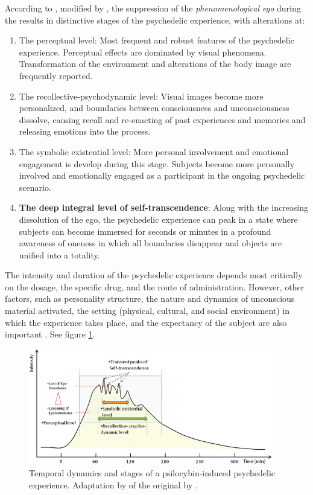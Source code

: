 According to \textcite{masters2000varieties}, modified by \textcite{preller2016phenomenology}, the suppression of the \textit{phenomenological ego} during the results in distinctive stages of the psychedelic experience, with alterations at:

\begin{enumerate}
    \setlength{\itemsep}{0pt}
    \setlength{\parskip}{0pt}
    \item The perceptual level: Most frequent and robust features of the psychedelic experience. Perceptual effects are dominated by visual phenomena. Transformation of the environment and alterations of the body image are frequently reported.
    \item The recollective-psychodynamic level: Visual images become more personalized, and boundaries between consciousness and unconsciousness dissolve, causing recall and re-enacting of past experiences and memories and releasing emotions into the process.
    \item The symbolic existential level: More personal involvement and emotional engagement is develop during this stage. Subjects become more personally involved and emotionally engaged as a participant in the ongoing psychedelic scenario.
    \item \textbf{The deep integral level of self-transcendence}: Along with the increasing dissolution of the ego, the psychedelic experience can peak in a state where subjects can become immersed for seconds or minutes in a profound awareness of oneness in which all boundaries disappear and objects are unified into a totality.
\end{enumerate}

The intensity and duration of the psychedelic experience depends most critically on the dosage, the specific drug, and the route of administration. However, other factors, such as personality structure, the nature and dynamics of unconscious material activated, the setting (physical, cultural, and social environment) in which the experience takes place, and the expectancy of the subject are also important \autocite{preller2016phenomenology}. See figure \ref{fig:temporal-dynamics}.

\begin{figure}[H]
    \centering
    \includegraphics[width=0.95\textwidth]{img/reused/preller2016phenomenology1.png}
    \caption{Temporal dynamics and stages of a psilocybin-induced psychedelic experience. Adaptation by \textcite{preller2016phenomenology} of the original by \textcite{leuner1962experimentelle}.}\label{fig:temporal-dynamics}
\end{figure}

